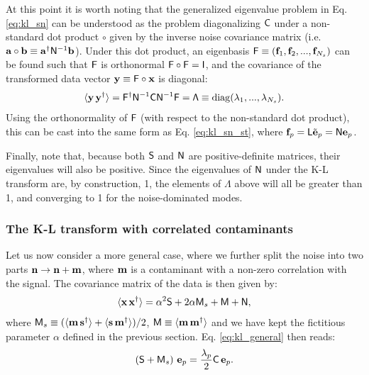 \documentclass[twocolumn,amsfont,amssymb,amsmath, showpacs,balancelastpage, nofootinbib]{revtex4-1}
\begin{document}
      At this point it is worth noting that the generalized eigenvalue problem in Eq. \ref{eq:kl_sn} can be understood as the problem diagonalizing ${\sf C}$ under a non-standard dot product $\circ$ given by the inverse noise covariance matrix (i.e. ${\bf a}\circ{\bf b}\equiv{\bf a}^\dag{\sf N}^{-1}{\bf b}$). Under this dot product, an eigenbasis ${\sf F}\equiv({\bf f}_1,{\bf f}_2,...,{\bf f}_{N_s})$ can be found such that ${\sf F}$ is orthonormal ${\sf F}\circ{\sf F}={\sf I}$, and the covariance of the transformed data vector ${\bf y}\equiv{\sf F}\circ{\bf x}$ is diagonal:
      \begin{equation}\label{eq:kl_sn_prod}
        \langle{\bf y}\,{\bf y}^\dag\rangle={\sf F}^\dag{\sf N}^{-1}{\sf C}{\sf N}^{-1}{\sf F}={\sf \Lambda}\equiv{\rm diag}(\lambda_1,...,\lambda_{N_s}).
      \end{equation}
      Using the orthonormality of ${\sf F}$ (with respect to the non-standard dot product), this can be cast into the same form as Eq. \ref{eq:kl_sn_st}, where ${\bf f}_p={\sf L}\tilde{\bf e}_p={\sf N}{\bf e}_p$.
      
      Finally, note that, because both ${\sf S}$ and ${\sf N}$ are positive-definite matrices, their eigenvalues will also be positive. Since the eigenvalues of ${\sf N}$ under the K-L transform are, by construction, 1, the elements of $\Lambda$ above will all be greater than 1, and converging to 1 for the noise-dominated modes.
      
    \subsubsection{The K-L transform with correlated contaminants}\label{sssec:method.klbasis.cr}
      Let us now consider a more general case, where we further split the noise into two parts ${\bf n}\rightarrow{\bf n}+{\bf m}$, where ${\bf m}$ is a contaminant with a non-zero correlation with the signal. The covariance matrix of the data is then given by:
      \begin{equation}
        \langle{\bf x}\,{\bf x}^\dag\rangle=\alpha^2{\sf S}+2\alpha{\sf M}_s+{\sf M}+{\sf N},
      \end{equation}
      where ${\sf M}_s\equiv(\langle{\bf m}\,{\bf s}^\dag\rangle+\langle{\bf s}\,{\bf m}^\dag\rangle)/2$, ${\sf M}\equiv\langle{\bf m}\,{\bf m}^\dag\rangle$ and we have kept the fictitious parameter $\alpha$ defined in the previous section.
      Eq. \ref{eq:kl_general} then reads:
      \begin{equation}\label{eq:kl_sn_corr}
        \left({\sf S}+{\sf M}_s\right)\,{\bf e}_p=
        \frac{\lambda_p}{2}{\sf C}\,{\bf e}_p.
      \end{equation}
      
\end{document}
